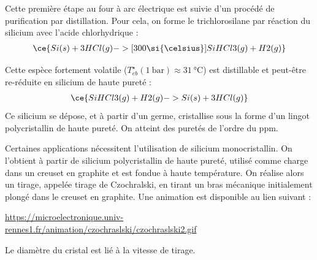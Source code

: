 \documentclass[a4paper]{book}
\begin{document}
Cette première étape au four à arc électrique est suivie d'un procédé de purification par distillation. Pour cela, on forme le trichlorosilane  par réaction du silicium avec l'acide chlorhydrique : 
\begin{align*}
\ce{Si(s) + 3HCl (g) ->[300 \si{\celsius}] SiHCl3(g) + H2(g)}
\end{align*}

Cette espèce fortement volatile ($T_{eb}^\star (1 ~ \si{\bar}) \approx 31 ~ \si{\celsius}$) est distillable et peut-être re-réduite en silicium de haute pureté : 
\begin{align*}
\ce{SiHCl3(g) + H2(g) -> Si(s) + 3HCl(g)}
\end{align*}
Ce silicium se dépose, et à partir d'un germe, cristallise sous la forme d'un lingot polycristallin de haute pureté. On atteint des puretés de l'ordre du ppm.


Certaines applications nécessitent l'utilisation de silicium monocristallin. On l'obtient à partir de silicium polycristallin de haute pureté, utilisé comme charge dans un creuset en graphite et est fondue à haute température. On réalise alors un tirage, appelée tirage de Czochralski, en tirant un bras mécanique initialement plongé dans le creuset en graphite. Une animation est disponible au lien suivant : 
\begin{center}
\url{https://microelectronique.univ-rennes1.fr/animation/czochraslski/czochraslski2.gif}
\end{center}

Le diamètre du cristal est lié à la vitesse de tirage.
\end{document}
